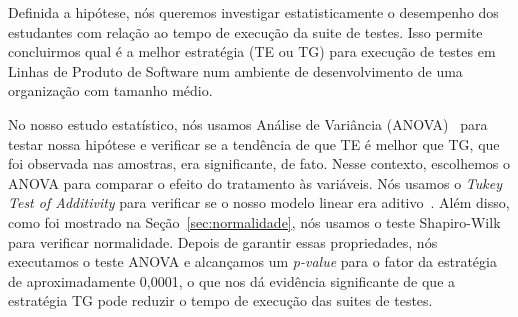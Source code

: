 Definida a hipótese, nós queremos investigar estatisticamente o desempenho dos estudantes com relação ao tempo de execução da suite de testes. Isso permite concluirmos qual é a melhor estratégia (TE ou TG) para execução de testes em Linhas de Produto de Software num ambiente de desenvolvimento de uma organização com tamanho médio.

No nosso estudo estatístico, nós usamos Análise de Variância (ANOVA)~\cite{Wohlin2000} para testar nossa hipótese e verificar se a tendência de que TE é melhor que TG, que foi observada nas amostras, era significante, de fato. Nesse contexto, escolhemos o ANOVA para comparar o efeito do tratamento às variáveis. Nós usamos o \emph{Tukey Test of Additivity} para verificar se o nosso modelo linear era aditivo~\cite{citeulike:2905018}. Além disso, como foi mostrado na Seção~\ref{sec:normalidade}, nós usamos o teste Shapiro-Wilk para verificar normalidade. Depois de garantir essas propriedades, nós executamos o teste ANOVA e alcançamos um \emph{p-value} para o fator da estratégia de aproximadamente 0,0001, o que nos dá evidência significante de que a estratégia TG pode reduzir o tempo de execução das suites de testes.